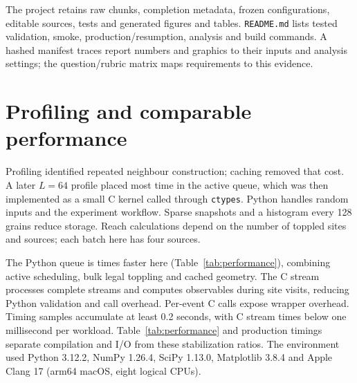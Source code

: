 The project retains raw chunks, completion metadata, frozen configurations, editable sources, tests and generated figures and tables. \texttt{README.md} lists tested validation, smoke, production/resumption, analysis and build commands. A hashed manifest traces report numbers and graphics to their inputs and analysis settings; the question/rubric matrix maps requirements to this evidence.

\section{Profiling and comparable performance}\label{sec:performance}
Profiling identified repeated neighbour construction; caching removed that cost. A later $L=64$ profile placed most time in the active queue, which was then implemented as a small C kernel called through \texttt{ctypes}. Python handles random inputs and the experiment workflow. Sparse snapshots and a histogram every 128 grains reduce storage. Reach calculations depend on the number of toppled sites and sources; each batch here has four sources.

\begin{table}[htbp]
\centering\small

\caption{Stabilization timings for identical $L=16$ workloads:  presampled inputs from an all-three grid, with  elementary topplings. After one full-workload warm-up per engine, each of five timing samples repeats complete workloads for at least 0.2\,s, resetting the grid each time. Times are divided by the number of workloads; all implementations produce identical $S,A,D,\ell$ and final grids. Compilation (\,s) and first load/warm-up (\,s) are measured separately. The range runs from minimum to maximum, and speed ratios use the Python scan median. Timings exclude I/O and input generation.}
\label{tab:performance}
\end{table}

The Python queue is  times faster here (Table~\ref{tab:performance}), combining active scheduling, bulk legal toppling and cached geometry. The C stream processes complete streams and computes observables during site visits, reducing Python validation and call overhead. Per-event C calls expose wrapper overhead. Timing samples accumulate at least 0.2 seconds, with C stream times below one millisecond per workload. Table~\ref{tab:performance} and production timings separate compilation and I/O from these stabilization ratios. The environment used Python 3.12.2, NumPy 1.26.4, SciPy 1.13.0, Matplotlib 3.8.4 and Apple Clang 17 (arm64 macOS, eight logical CPUs).

